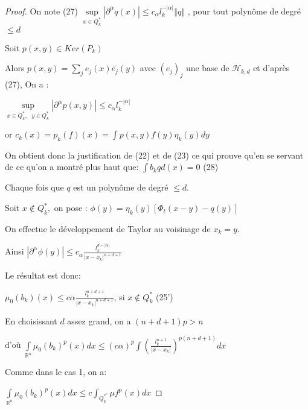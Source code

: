 \documentclass[12pt, a4paper, oneside]{article}
\begin{document}
\begin{proof}
	On note (27) $\underset{x\in Q_{k}^{\ast }}{\sup }\left\vert \partial
	^{\alpha }q(x)\right\vert \leq c_{\alpha }l_{k}^{-\left\vert \alpha
		\right\vert }\left\Vert q\right\Vert $ , pour tout polynôme de degré $\leq d$
	
	Soit $p(x,y)\in Ker(P_{k})$
	
	Alors $p(x,y)=\sum\limits_{j}e_{j}(x)\overset{-}{e_{j}}(y)$ avec $
	(e_{j})_{j}$ une base de $\mathcal{H}_{k,d}$ et d'après (27), On a :
	
	$\underset{x\in Q_{k}^{\ast },\text{ }y\in Q_{k}^{\ast }}{\sup }\left\vert
	\partial ^{\alpha }p(x,y)\right\vert \leq c_{\alpha }l_{k}^{-\left\vert
		\alpha \right\vert }$
	
	or $c_{k}(x)=p_{k}(f)(x)=\int p(x,y)f(y)\eta _{k}(y)dy$
	
	On obtient donc la justification de (22) et de (23) ce qui prouve qu'en se
	servant de ce qu'on a montré plus haut que: $\int b_{k}qd(x)=0$ (28)
	
	Chaque fois que $q$ est un polynôme de degré $\leq d.$
	
	Soit $x\notin Q_{k}^{\ast },$ on pose : $\phi (y)=\eta _{k}(y)[\Phi
	_{t}(x-y)-q(y)]$
	
	On effectue le développement de Taylor au voisinage de $x_{k}=y.$
	
	Ainsi $\left\vert \partial ^{\alpha }\phi (y)\right\vert \leq c_{\alpha }
	\frac{l_{k}^{d-\left\vert \alpha \right\vert }}{\left\vert
		x-x_{k}\right\vert ^{n+d+1}}$
	
	Le résultat est donc:
	
	$\mu _{0}(b_{k})(x)\leq c\alpha \frac{l_{k}^{n+d+1}}{\left\vert
		x-x_{k}\right\vert ^{n+d+1}}$, si $x\notin Q_{k}^{\ast }$ (25')
	
	En choisissant $d$ assez grand, on a $(n+d+1)p>n$
	
	d'où  $\int\limits_{\mathbb{R}^{n}}\mu _{0}(b_{k})^{p}(x)dx\leq (c\alpha )^{p}\int (\frac{l_{k}^{n+1}}{
		\left\vert x-x_{k}\right\vert })^{p(n+d+1)}dx$
	
	Comme dans le cas 1, on a:
	
	$\int\limits_{\mathbb{R}^{n}}\mu _{0}(b_{k})^{p}(x)dx\leq c\int_{Q_{k}^{\ast ^{c}}}\mu f^{p}(x)dx$
\end{proof}
\end{document}
